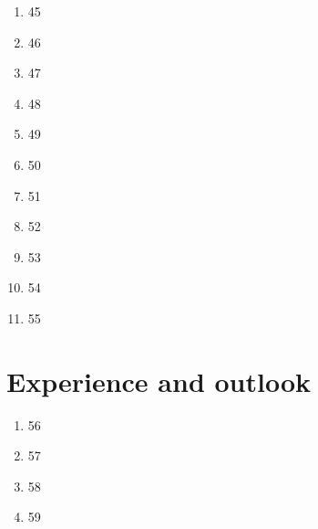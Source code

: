 \documentclass{article}
\begin{document}
\begin{enumerate}
\item 45
\item 46
\item 47
\item 48
\item 49
\item 50
\item 51
\item 52
\item 53
\item 54
\item 55
\end{enumerate}

\section{Experience and outlook}

\begin{enumerate}
\item 56
\item 57
\item 58
\item 59
\end{enumerate}






\end{document}
